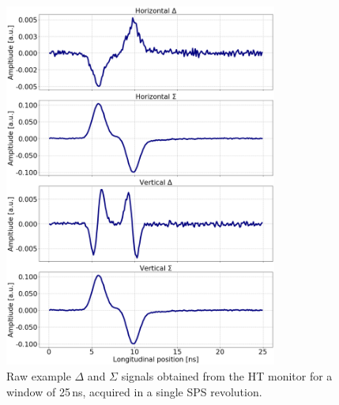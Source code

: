 \begin{figure}[!h]
   \centering         
   \includegraphics[width=0.8\textwidth]{images/Ch4/HT_1D__20180530_114730_exampleAcq_4thesis_turn3000.png}
       \caption{Raw example $\Delta$ and $\Sigma$ signals obtained from the HT monitor for a window of 25\,ns, acquired in a single SPS revolution.}
       \label{fig:HT_example_acq_singleTurn}
\end{figure}

